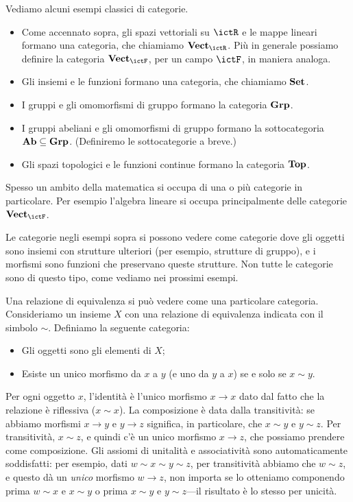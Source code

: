 \begin{examples} 
 Vediamo alcuni esempi classici di categorie. 
 \begin{itemize}
  \item Come accennato sopra, gli spazi vettoriali su $\ictR$ e le mappe lineari formano una categoria, che chiamiamo $\ctVect_\ictR$. Più in generale possiamo definire la categoria $\ctVect_\ictF$, per un campo $\ictF$, in maniera analoga.
  \item Gli insiemi e le funzioni formano una categoria, che chiamiamo $\mathbf{Set}$.
  \item I gruppi e gli omomorfismi di gruppo formano la categoria $\mathbf{Grp}$.
  \item I gruppi abeliani e gli omomorfismi di gruppo formano la sottocategoria $\mathbf{Ab}\subseteq\mathbf{Grp}$. (Definiremo le sottocategorie a breve.)
  \item Gli spazi topologici e le funzioni continue formano la categoria $\mathbf{Top}$. 
 \end{itemize}
Spesso un ambito della matematica si occupa di una o più categorie in particolare. Per esempio l'algebra lineare si occupa principalmente delle categorie $\ctVect_\ictF$.
\end{examples}

Le categorie negli esempi sopra si possono vedere come categorie dove gli oggetti sono insiemi con strutture ulteriori (per esempio, strutture di gruppo), e i morfismi sono funzioni che preservano queste strutture. Non tutte le categorie sono di questo tipo, come vediamo nei prossimi esempi. 

\begin{example}
 Una relazione di equivalenza si può vedere come una particolare categoria. Consideriamo un insieme $X$ con una relazione di equivalenza indicata con il simbolo $\sim$.
 Definiamo la seguente categoria:
 \begin{itemize}
  \item Gli oggetti sono gli elementi di $X$;
  \item Esiste un unico morfismo da $x$ a $y$ (e uno da $y$ a $x$) se e solo se $x\sim y$. 
 \end{itemize}
 Per ogni oggetto $x$, l'identità è l'unico morfismo $x\to x$ dato dal fatto che la relazione è riflessiva ($x\sim x$). 
 La composizione è data dalla transitività: se abbiamo morfismi $x\to y$ e $y\to z$ significa, in particolare, che $x\sim y$ e $y\sim z$. Per transitività, $x\sim z$, e quindi c'è un unico morfismo $x\to z$, che possiamo prendere come composizione. 
 Gli assiomi di unitalità e associatività sono automaticamente soddisfatti: per esempio, dati $w\sim x\sim y\sim z$, per transitività abbiamo che $w\sim z$, e questo dà un \emph{unico} morfismo $w\to z$, non importa se lo otteniamo componendo prima $w\sim x$ e $x\sim y$ o prima $x\sim y$ e $y\sim z$---il risultato è lo stesso per unicità. 
\end{example}

